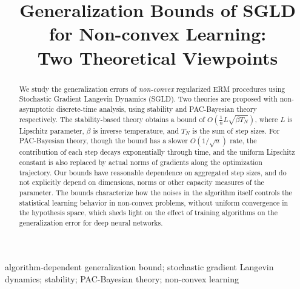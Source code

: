 \documentclass[final,12pt]{colt2018} %
\title[Generalization Bounds of SGLD for Non-convex Learning]{Generalization Bounds of SGLD for Non-convex Learning:\\
Two Theoretical Viewpoints}
\begin{document}
\maketitle

\begin{abstract}
We study the generalization errors of \emph{non-convex} regularized ERM procedures using Stochastic Gradient Langevin Dynamics (SGLD). Two theories are proposed with non-asymptotic discrete-time analysis, using stability and PAC-Bayesian theory respectively. The stability-based theory obtains a bound of $O\left(\frac{1}{n}L\sqrt{\beta T_N}\right)$, where $L$ is Lipschitz parameter, $\beta$ is inverse temperature, and $T_N$ is the sum of step sizes. For PAC-Bayesian theory, though the bound has a slower $O(1/\sqrt{n})$ rate, the contribution of each step decays exponentially through time, and the uniform Lipschitz constant is also replaced by actual norms of gradients along the optimization trajectory. Our bounds have reasonable dependence on aggregated step sizes, and do not explicitly depend on dimensions, norms or other capacity measures of the parameter. The bounds characterize how the noises in the algorithm itself controls the statistical learning behavior in non-convex problems, without uniform convergence in the hypothesis space, which sheds light on the effect of training algorithms on the generalization error for deep neural networks.
\end{abstract}

\begin{keywords}
algorithm-dependent generalization bound; stochastic gradient Langevin dynamics; stability; PAC-Bayesian theory; non-convex learning
\end{keywords}
\end{document}
